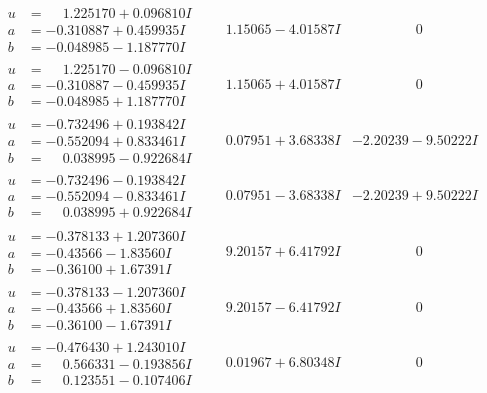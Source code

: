 \documentclass[1p]{elsarticle_modified}
\theoremstyle{definition}
\begin{document}
$$\begin{array}{c|c|c}
\begin{aligned}
u &= \phantom{-}1.225170 + 0.096810 I \\
a &= -0.310887 + 0.459935 I \\
b &= -0.048985 - 1.187770 I\end{aligned}
 & \phantom{-}1.15065 - 4.01587 I & \phantom{-0.000000 } 0 \\ \hline\begin{aligned}
u &= \phantom{-}1.225170 - 0.096810 I \\
a &= -0.310887 - 0.459935 I \\
b &= -0.048985 + 1.187770 I\end{aligned}
 & \phantom{-}1.15065 + 4.01587 I & \phantom{-0.000000 } 0 \\ \hline\begin{aligned}
u &= -0.732496 + 0.193842 I \\
a &= -0.552094 + 0.833461 I \\
b &= \phantom{-}0.038995 - 0.922684 I\end{aligned}
 & \phantom{-}0.07951 + 3.68338 I & -2.20239 - 9.50222 I \\ \hline\begin{aligned}
u &= -0.732496 - 0.193842 I \\
a &= -0.552094 - 0.833461 I \\
b &= \phantom{-}0.038995 + 0.922684 I\end{aligned}
 & \phantom{-}0.07951 - 3.68338 I & -2.20239 + 9.50222 I \\ \hline\begin{aligned}
u &= -0.378133 + 1.207360 I \\
a &= -0.43566 - 1.83560 I \\
b &= -0.36100 + 1.67391 I\end{aligned}
 & \phantom{-}9.20157 + 6.41792 I & \phantom{-0.000000 } 0 \\ \hline\begin{aligned}
u &= -0.378133 - 1.207360 I \\
a &= -0.43566 + 1.83560 I \\
b &= -0.36100 - 1.67391 I\end{aligned}
 & \phantom{-}9.20157 - 6.41792 I & \phantom{-0.000000 } 0 \\ \hline\begin{aligned}
u &= -0.476430 + 1.243010 I \\
a &= \phantom{-}0.566331 - 0.193856 I \\
b &= \phantom{-}0.123551 - 0.107406 I\end{aligned}
 & \phantom{-}0.01967 + 6.80348 I & \phantom{-0.000000 } 0 \\ \hline\begin{aligned}

\end{aligned}
\end{array}$$
\end{document}

